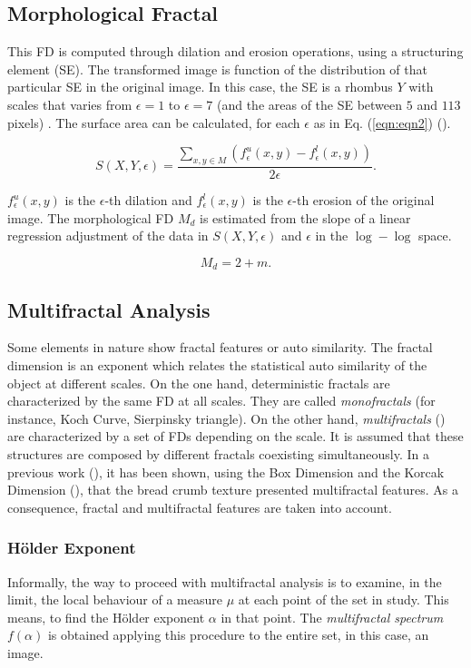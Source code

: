 \documentclass[oneside,a4paper,english,links]{amca}
\begin{document}
\subsection{Morphological Fractal}
This FD is computed through dilation and erosion operations, using a structuring element (SE). The transformed image is function of the distribution of that particular SE in the original image.  In this case, the SE is a rhombus $Y$ with scales that varies from $\epsilon = 1$ to $\epsilon = 7$ (and the areas of the SE between $5$ and $113$ pixels)  . The surface area can be calculated, for each $\epsilon$ as in Eq. (\ref{eqn:eqn2}) (\cite{Gonzales2008}).

\begin{equation}
S(X,Y,\epsilon) = \frac{\sum_{x,y \in M} (f_{\epsilon}^{u}(x,y) - f_{\epsilon}^{l}(x,y))}{2\epsilon}.
\label{eqn:eqn2}
\end{equation}

$f_{\epsilon}^{u}(x,y)$ is the $\epsilon$-th dilation and $f_{\epsilon}^{l}(x,y)$ is the $\epsilon$-th erosion of the original image. The morphological FD $M_{d}$ is estimated from the slope of a linear regression adjustment of the data in $S(X,Y,\epsilon)$ and $\epsilon$ in the $\log-\log$ space.

\begin{equation}
M_{d} = 2 + m.
\label{eqn:eqn3}
\end{equation}

\subsection{Multifractal Analysis}
Some elements in nature show fractal features or auto similarity. The fractal dimension is an exponent which relates the statistical auto similarity of the object at different scales. On the one hand, deterministic fractals are characterized by the same FD at all scales. They are called {\em monofractals} (for instance, Koch Curve, Sierpinsky triangle). On the other hand, {\em multifractals} (\cite{Mandelbrot89}) are characterized by a set of FDs depending on the scale. It is assumed that these structures are composed by different fractals coexisting simultaneously. In a previous work (\cite{Baravalle2012}), it has been shown, using the Box Dimension and the Korcak Dimension (\cite{Imre11}), that the bread crumb texture presented multifractal features. As a consequence, fractal and multifractal features are taken into account.

\subsubsection{H\"older Exponent}
Informally, the way to proceed with multifractal analysis is to examine, in the limit, the local behaviour of a measure $\mu$ at each point of the set in study. This means, to find the H\"older exponent $\alpha$ in that point. The {\em multifractal spectrum} $f(\alpha)$ is obtained applying this procedure to the entire set, in this case, an image.
\end{document}
